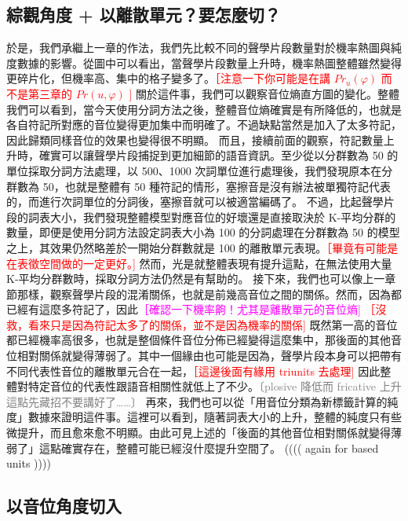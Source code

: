 \subsection{綜觀角度 + 以離散單元？要怎麼切？}
        於是，我們承繼上一章的作法，我們先比較不同的聲學片段數量對於機率熱圖與純度數據的影響。從圖中可以看出，當聲學片段數量上升時，機率熱圖整體雖然變得更碎片化，但機率高、集中的格子變多了。\textcolor{red}{［注意一下你可能是在講 $Pr_u(\varphi)$ 而不是第三章的 $Pr(u, \varphi)$ ] }
        關於這件事，我們可以觀察音位熵直方圖的變化。整體我們可以看到，當今天使用分詞方法之後，整體音位熵確實是有所降低的，也就是各自符記所對應的音位變得更加集中而明確了。不過缺點當然是加入了太多符記，因此歸類同樣音位的效果也變得很不明顯。
        而且，接續前面的觀察，符記數量上升時，確實可以讓聲學片段捕捉到更加細節的語音資訊。至少從以分群數為 50 的單位採取分詞方法處理，以 500、1000 次詞單位進行處理後，我們發現原本在分群數為 50，也就是整體有 50 種符記的情形，塞擦音是沒有辦法被單獨符記代表的，而進行次詞單位的分詞後，塞擦音就可以被適當編碼了。
        不過，比起聲學片段的詞表大小，我們發現整體模型對應音位的好壞還是直接取決於 K-平均分群的數量，即便是使用分詞方法設定詞表大小為 100 的分詞處理在分群數為 50 的模型之上，其效果仍然略差於一開始分群數就是 100 的離散單元表現。\textcolor{red}{［畢竟有可能是在表徵空間做的一定更好。] }然而，光是就整體表現有提升這點，在無法使用大量 K-平均分群數時，採取分詞方法仍然是有幫助的。
        接下來，我們也可以像上一章節那樣，觀察聲學片段的混淆關係，也就是前幾高音位之間的關係。然而，因為都已經有這麼多符記了，因此\textcolor{magenta}{［確認一下機率齁！尤其是離散單元的音位熵] } \textcolor{red}{［沒救，看來只是因為符記太多了的關係，並不是因為機率的關係] }既然第一高的音位都已經機率高很多，也就是整個條件音位分佈已經變得這麼集中，那後面的其他音位相對關係就變得薄弱了。其中一個緣由也可能是因為，聲學片段本身可以把帶有不同代表性音位的離散單元合在一起，\textcolor{red}{［這邊後面有緣用 triunits 去處理] } 因此整體對特定音位的代表性跟語音相關性就低上了不少。\textcolor{gray}{〔plosive 降低而 fricative 上升這點先藏招不要講好了……〕 }
        再來，我們也可以從「用音位分類為新標籤計算的純度」數據來證明這件事。這裡可以看到，隨著詞表大小的上升，整體的純度只有些微提升，而且愈來愈不明顯。由此可見上述的「後面的其他音位相對關係就變得薄弱了」這點確實存在，整體可能已經沒什麼提升空間了。
        (((( again for based units ))))

\subsection{以音位角度切入}

